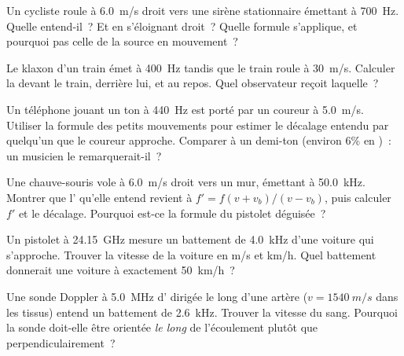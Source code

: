 \begin{exercise}[$\star$]\label{exo:g12:doppler-effect:3}
Un cycliste roule à \qty{6.0}{m/s} droit vers une sirène stationnaire
émettant à \qty{700}{Hz}. Quelle  entend-il~? Et
en s'éloignant droit~? Quelle formule s'applique, et pourquoi pas
celle de la source en mouvement~?
\end{exercise}

\begin{exercise}[$\star$]\label{exo:g12:doppler-effect:4}
Le klaxon d'un train émet à \qty{400}{Hz} tandis que le train roule
à \qty{30}{m/s}. Calculer la  devant le
train, derrière lui, et au repos. Quel observateur reçoit laquelle~?
\end{exercise}

\begin{exercise}[$\star$]\label{exo:g12:doppler-effect:5}
Un téléphone jouant un ton à \qty{440}{Hz} est porté par un coureur à
\qty{5.0}{m/s}. Utiliser la formule des petits mouvements pour
estimer le décalage entendu par quelqu'un que le coureur approche.
Comparer à un demi-ton (environ $6\%$ en )~: un
musicien le remarquerait-il~?
\end{exercise}

\begin{exercise}[$\star\star$]\label{exo:g12:doppler-effect:6}
Une chauve-souris vole à \qty{6.0}{m/s} droit vers un mur, émettant à
\qty{50.0}{kHz}. Montrer que l' qu'elle entend revient à
$f' = f(v + v_b)/(v - v_b)$, puis calculer $f'$ et le décalage.
Pourquoi est-ce la formule du pistolet  déguisée~?
\end{exercise}

\begin{exercise}[$\star\star$]\label{exo:g12:doppler-effect:7}
Un pistolet  à \qty{24.15}{GHz} mesure un battement de
\qty{4.0}{kHz} d'une voiture qui s'approche. Trouver la vitesse de la
voiture en \unit{m/s} et \unit{km/h}. Quel battement donnerait une
voiture à exactement \qty{50}{km/h}~?
\end{exercise}

\begin{exercise}[$\star\star$]\label{exo:g12:doppler-effect:8}
Une sonde Doppler à \qty{5.0}{MHz} d' dirigée le
long d'une artère ($v = \qty{1540}{m/s}$ dans les tissus) entend un
battement de \qty{2.6}{kHz}. Trouver la vitesse du sang. Pourquoi la
sonde doit-elle être orientée \emph{le long} de l'écoulement plutôt
que perpendiculairement~?
\end{exercise}

